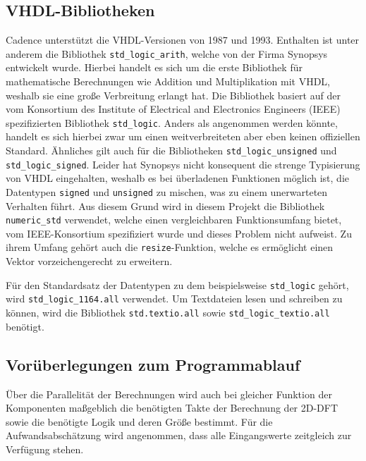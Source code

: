  \subsection{VHDL-Bibliotheken}
 Cadence unterstützt die VHDL-Versionen von 1987 und 1993. 
 Enthalten ist unter anderem die Bibliothek \texttt{std\_logic\_arith}, welche von der Firma Synopsys entwickelt wurde. Hierbei handelt es sich um die erste Bibliothek
 für mathematische Berechnungen wie Addition und Multiplikation mit VHDL, weshalb sie eine große Verbreitung erlangt hat.
 Die Bibliothek basiert auf der vom Konsortium des Institute of Electrical and Electronics Engineers (IEEE) spezifizierten Bibliothek \texttt{std\_logic}. Anders als angenommen werden könnte, handelt es sich hierbei zwar um einen weitverbreiteten aber eben keinen offiziellen Standard.
 Ähnliches gilt auch für die Bibliotheken \texttt{std\_logic\_unsigned} und \texttt{std\_logic\_signed}.
 Leider hat Synopsys nicht konsequent die strenge Typisierung von VHDL eingehalten, weshalb es bei überladenen Funktionen möglich ist, die Datentypen \texttt{signed} und \texttt{unsigned} zu mischen, was zu einem unerwarteten Verhalten führt.
 Aus diesem Grund wird in diesem Projekt die Bibliothek \texttt{numeric\_std} verwendet, welche einen vergleichbaren Funktionsumfang bietet, vom IEEE-Konsortium spezifiziert wurde und dieses Problem nicht aufweist. Zu ihrem 
 Umfang gehört auch die \texttt{resize}-Funktion, welche es ermöglicht einen Vektor vorzeichengerecht zu erweitern.
 
Für den Standardsatz der Datentypen zu dem beispielsweise \texttt{std\_logic} gehört, wird 
\texttt{std\_logic\_1164.all} verwendet.
Um Textdateien lesen und schreiben zu können, wird die Bibliothek \texttt{std.textio.all} sowie 
\texttt{std\_logic\_textio.all} benötigt.

 
\subsection{Vorüberlegungen zum Programmablauf}
Über die Parallelität der Berechnungen wird auch bei gleicher Funktion der Komponenten maßgeblich die benötigten Takte der Berechnung der 2D-DFT sowie die benötigte
Logik und deren Größe bestimmt. 
Für die Aufwandsabschätzung wird angenommen, dass alle Eingangswerte zeitgleich zur Verfügung stehen.

